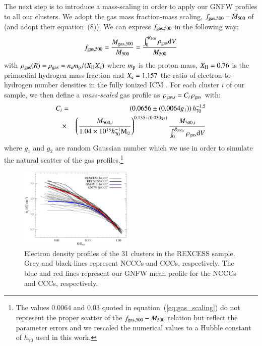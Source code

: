 \documentclass[useAMS,usenatbib]{mn2e}
\begin{document}
The next step is to introduce a mass-scaling in order to apply our GNFW profiles
to all our clusters. We adopt the gas mass fraction-mass scaling,
$f_{{\mathrm{gas}},500}-M_{500}$ of \cite{2009ApJ...693.1142S} (and adopt their equation~(8)). We can
express $f_{{\mathrm{gas}},500}$ in the following way:
\begin{equation}
f_{{\mathrm{gas}},500} = \frac{M_{{\mathrm{gas}},500}}{M_{500}}  = \frac{\int_{0}^{R_{500}} \rho_{{\mathrm{gas}}} {\mathrm{d}}V}{M_{500}}
\label{eq:m500}
\end{equation}
with $\rho_{{\mathrm{gas}}}(R) = \rho_{{\mathrm{gas}}} = n_{{\mathrm{e}}} m_{{\mathrm{p}}} / ( X_{{\mathrm{H}}}X_{{\mathrm{e}}} )$ where
$m_{{\mathrm{p}}}$ is the proton mass, $X_{{\mathrm{H}}} = 0.76$ is the primordial hydrogen
mass fraction and $X_{{\mathrm{e}}} = 1.157$ the ratio of electron-to-hydrogen number
densities in the fully ionized ICM \citep{1988xrec.book.....S}. For each cluster
$i$ of our sample, we then define a \emph{mass-scaled} gas profile as
$\rho_{{\mathrm{gas}},i}=C_{i} \,\rho_{{\mathrm{gas}}}$ with:
\begin{eqnarray}
C_{i}  & = &  (0.0656\pm(0.0064g_{1})) \, h_{70}^{-1.5}  \nonumber \\
 & \times & \left(\frac{M_{500,i}}{1.04 \times 10^{13} h_{70}^{-1} {\mathrm{M_{\odot}}}}\right)^{0.135\pm(0.030g_{2})} \frac{M_{500,i}}{\int_{0}^{R_{500,i}} \rho_{{\mathrm{gas}}} {\mathrm{d}}V}
\label{eq:gas_scaling}
\end{eqnarray}
where $g_{1}$ and $g_{2}$ are random Gaussian number which we use in order to
simulate the natural scatter of the gas profiles.\footnote{The values
  $0.0064$ and $0.03$ quoted in equation~(\ref{eq:gas_scaling}) do not represent
  the proper scatter of the $f_{{\mathrm{gas}},500}-M_{500}$ relation but reflect the
  parameter errors and we rescaled the numerical values to a Hubble constant of
  $h_{70}$ used in this work.}

\begin{figure} 
\centering
\includegraphics[width=0.48\textwidth]{figures/gas_profiles.eps}
\caption{Electron density profiles of the 31 clusters in the REXCESS sample. Grey and black lines represent NCCCs and CCCs, respectively. The blue and red lines represent our GNFW mean profile for the NCCCs and CCCs, respectively.}
\label{fig:gas_profiles}
\end{figure}
\end{document}
